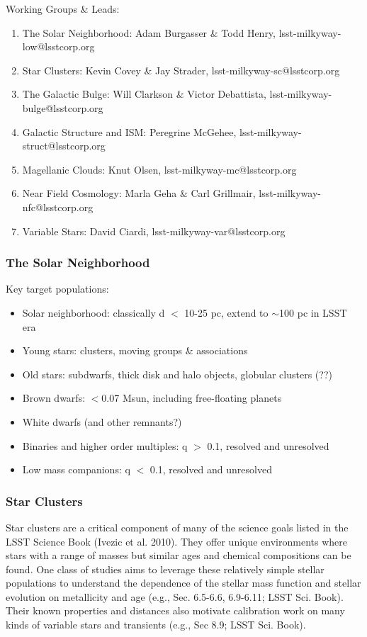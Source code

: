Working Groups \& Leads:
\begin{enumerate}
\item The Solar Neighborhood: Adam Burgasser \& Todd Henry, lsst-milkyway-low@lsstcorp.org
\item Star Clusters: Kevin Covey \& Jay Strader, lsst-milkyway-sc@lsstcorp.org
\item The Galactic Bulge: Will Clarkson \& Victor Debattista, lsst-milkyway-bulge@lsstcorp.org
\item Galactic Structure and ISM: Peregrine McGehee, lsst-milkyway-struct@lsstcorp.org
\item Magellanic Clouds: Knut Olsen, lsst-milkyway-mc@lsstcorp.org
\item Near Field Cosmology: Marla Geha \& Carl Grillmair, lsst-milkyway-nfc@lsstcorp.org
\item Variable Stars: David Ciardi, lsst-milkyway-var@lsstcorp.org
\end{enumerate}

\subsubsection{The Solar Neighborhood}

Key target populations:
\begin{itemize}
\item{Solar 
neighborhood: classically d $<$ 10-25 pc, extend to $\sim$100 pc in LSST era}
\item{Young 
stars: clusters, moving groups \& associations }
\item{Old 
stars: subdwarfs, thick disk and halo objects, globular clusters (??) }
\item{Brown 
dwarfs: $<$0.07 Msun, including free-floating planets }
\item{White 
dwarfs (and other remnants?) }
\item{Binaries 
and higher order multiples: q $>$ 0.1, resolved and unresolved}
\item{Low 
mass companions: q $<$ 0.1, resolved and unresolved }
\end{itemize}


\subsubsection{Star Clusters}

Star clusters are a critical component of many of the science goals listed in the LSST Science Book (Ivezic et al. 2010). They offer unique environments where stars with a range of masses but similar ages and chemical compositions can be found. One class of studies aims to leverage these relatively simple stellar populations to understand the dependence of the stellar mass function and stellar evolution on metallicity and age (e.g., Sec. 6.5-6.6, 6.9-6.11; LSST Sci. Book). Their known properties and distances also motivate calibration work on many kinds of variable stars and transients (e.g., Sec 8.9; LSST Sci. Book). 


